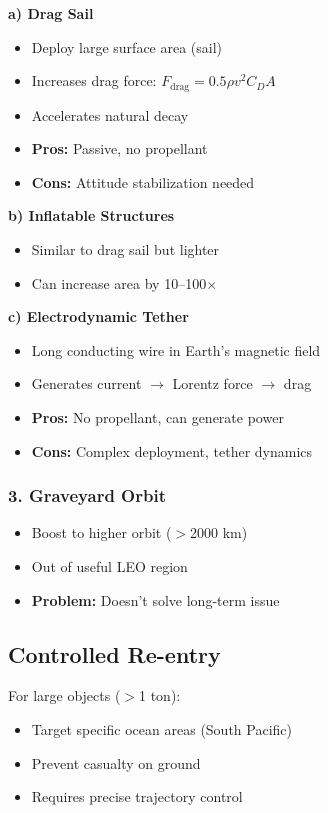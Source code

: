 \documentclass[11pt,a4paper]{article}
\begin{document}
\textbf{a) Drag Sail}
\begin{itemize}[leftmargin=*]
    \item Deploy large surface area (sail)
    \item Increases drag force: $F_{\text{drag}} = 0.5 \rho v^2 C_D A$
    \item Accelerates natural decay
    \item \textbf{Pros:} Passive, no propellant
    \item \textbf{Cons:} Attitude stabilization needed
\end{itemize}

\textbf{b) Inflatable Structures}
\begin{itemize}[leftmargin=*]
    \item Similar to drag sail but lighter
    \item Can increase area by 10--100$\times$
\end{itemize}

\textbf{c) Electrodynamic Tether}
\begin{itemize}[leftmargin=*]
    \item Long conducting wire in Earth's magnetic field
    \item Generates current $\rightarrow$ Lorentz force $\rightarrow$ drag
    \item \textbf{Pros:} No propellant, can generate power
    \item \textbf{Cons:} Complex deployment, tether dynamics
\end{itemize}

\subsubsection{3. Graveyard Orbit}
\begin{itemize}[leftmargin=*]
    \item Boost to higher orbit ($>$2000 km)
    \item Out of useful LEO region
    \item \textbf{Problem:} Doesn't solve long-term issue
\end{itemize}

\subsection{Controlled Re-entry}

For large objects ($>$1 ton):
\begin{itemize}[leftmargin=*]
    \item Target specific ocean areas (South Pacific)
    \item Prevent casualty on ground
    \item Requires precise trajectory control
\end{itemize}
\end{document}
